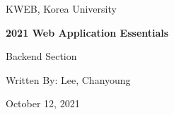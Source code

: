 \begin{titlepage}
    \centering
    \vspace*{35mm}
    \par\vspace{5mm}
    {\large KWEB, Korea University}
    \par\vspace{20mm}
    {\large\bfseries 2021 Web Application Essentials \par\huge Backend Section}
    \par\vspace{30mm}
    {\large Written By: Lee, Chanyoung}
    \par\vspace{30mm}
    {\large October 12, 2021}
\end{titlepage}
